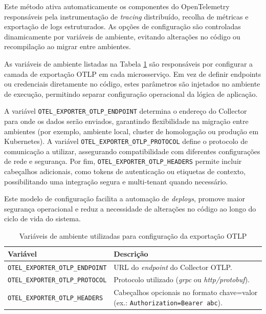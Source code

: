 Este método ativa automaticamente os componentes do OpenTelemetry responsáveis pela instrumentação de \textit{tracing} distribuído, recolha de métricas e exportação de logs estruturados. As opções de configuração são controladas dinamicamente por variáveis de ambiente, evitando alterações no código ou recompilação ao migrar entre ambientes.


As variáveis de ambiente listadas na Tabela \ref{tab:otel_env_vars} são responsáveis por configurar a camada de exportação OTLP em cada microsserviço. Em vez de definir endpoints ou credenciais diretamente no código, estes parâmetros são injetados no ambiente de execução, permitindo separar configuração operacional da lógica de aplicação.

A variável \texttt{OTEL\_EXPORTER\_OTLP\_ENDPOINT} determina o endereço do Collector para onde os dados serão enviados, garantindo flexibilidade na migração entre ambientes (por exemplo, ambiente local, cluster de homologação ou produção em Kubernetes). A variável \texttt{OTEL\_EXPORTER\_OTLP\_PROTOCOL} define o protocolo de comunicação a utilizar, assegurando compatibilidade com diferentes configurações de rede e segurança. Por fim, \texttt{OTEL\_EXPORTER\_OTLP\_HEADERS} permite incluir cabeçalhos adicionais, como tokens de autenticação ou etiquetas de contexto, possibilitando uma integração segura e multi-tenant quando necessário.

Este modelo de configuração facilita a automação de \textit{deploys}, promove maior segurança operacional e reduz a necessidade de alterações no código ao longo do ciclo de vida do sistema.


\begin{table}[H]
\centering
\begin{tabular}{|p{6cm}|p{8cm}|}
\hline
\textbf{Variável} & \textbf{Descrição} \\ \hline
\texttt{OTEL\_EXPORTER\_OTLP\_ENDPOINT} & URL do \textit{endpoint} do Collector OTLP. \\ \hline
\texttt{OTEL\_EXPORTER\_OTLP\_PROTOCOL} & Protocolo utilizado (\textit{grpc} ou \textit{http/protobuf}). \\ \hline
\texttt{OTEL\_EXPORTER\_OTLP\_HEADERS} & Cabeçalhos opcionais no formato chave=valor (ex.: \texttt{Authorization=Bearer abc}). \\ \hline
\end{tabular}
\caption{Variáveis de ambiente utilizadas para configuração da exportação OTLP}
\label{tab:otel_env_vars}
\end{table}


